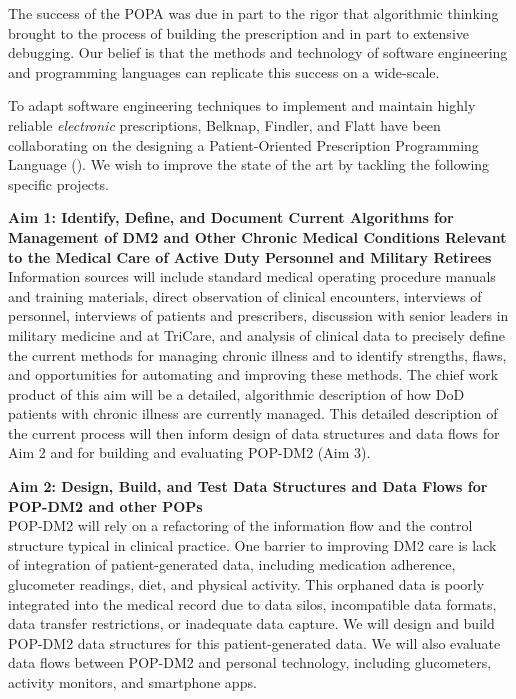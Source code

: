 \documentclass[11pt]{article}
\begin{document}
The success of the POPA was due in part to the rigor that algorithmic
thinking brought to the process of building the prescription and in
part to extensive debugging. Our belief is that the methods and
technology of software engineering and programming languages can
replicate this success on a wide-scale.

To adapt software engineering techniques to implement and maintain
highly reliable \emph{electronic} prescriptions, Belknap, Findler, and
Flatt have been collaborating on the designing a Patient-Oriented
Prescription Programming Language (\poppl{}). We wish to improve the
state of the art by tackling the following specific projects.

\newcommand{\aim}[1]{\vspace{.1in}\noindent\textbf{Aim #1}\\}

\aim{1: Identify, Define, and Document Current Algorithms for Management of DM2 and Other Chronic Medical Conditions Relevant to the Medical Care of Active Duty Personnel and Military Retirees}
 Information sources will include standard medical operating procedure
 manuals and training materials, direct observation of clinical
 encounters, interviews of personnel, interviews of patients and
 prescribers, discussion with senior leaders in military medicine and
 at TriCare, and analysis of clinical data to precisely define the
 current methods for managing chronic illness and to identify
 strengths, flaws, and opportunities for automating and improving
 these methods. The chief work product of this aim will be a detailed,
 algorithmic description of how DoD patients with chronic illness are
 currently managed. This detailed description of the current process
 will then inform design of data structures and data flows for 
 Aim 2 and for building and evaluating POP-DM2 (Aim 3).

\aim{2: Design, Build, and Test Data Structures and Data Flows for POP-DM2 and other POPs}
 POP-DM2 will rely on a refactoring of the information flow and the
 control structure typical in clinical practice. One barrier to
 improving DM2 care is lack of integration of patient-generated data,
 including medication adherence, glucometer readings, diet, and
 physical activity. This orphaned data is poorly integrated into the
 medical record due to data silos, incompatible data formats, data
 transfer restrictions, or inadequate data capture. We will design and
 build POP-DM2 data structures for this patient-generated data. We
 will also evaluate data flows between POP-DM2 and personal
 technology, including glucometers, activity monitors, and smartphone
 apps.
\end{document}
